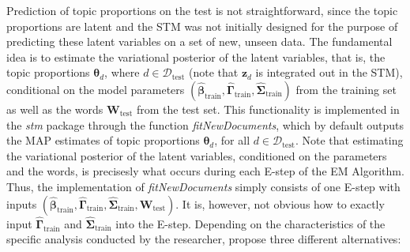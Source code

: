 Prediction of topic proportions on the test is not straightforward, since the topic proportions are latent and the STM was not initially designed for the purpose of predicting these latent variables on a set of new, unseen data. The fundamental idea is to estimate the variational posterior of the latent variables, that is, the topic proportions $\boldsymbol{\theta}_d$, where $d \in \mathcal{D}_{\text{test}}$ (note that $\boldsymbol{z}_d$ is integrated out in the STM), conditional on the model parameters $(\hat{\boldsymbol{\beta}}_{\text{train}}, \hat{\boldsymbol{\Gamma}}_{\text{train}}, \hat{\boldsymbol{\Sigma}}_{\text{train}})$ from the training set as well as the words $\boldsymbol{W}_{\text{test}}$ from the test set. This functionality is implemented in the \textit{stm} package through the function \textit{fitNewDocuments}, which by default outputs the MAP estimates of topic proportions $\boldsymbol{\theta}_d$, for all $d \in \mathcal{D}_{\text{test}}$. Note that estimating the variational posterior of the latent variables, conditioned on the parameters and the words, is precisesly what occurs during each E-step of the EM Algorithm. Thus, the implementation of \textit{fitNewDocuments} simply consists of one E-step with inputs $(\hat{\boldsymbol{\beta}}_{\text{train}}, \hat{\boldsymbol{\Gamma}}_{\text{train}}, \hat{\boldsymbol{\Sigma}}_{\text{train}}, \boldsymbol{W}_{\text{test}})$. It is, however, not obvious how to exactly input $\hat{\boldsymbol{\Gamma}}_{\text{train}}$ and  $\hat{\boldsymbol{\Sigma}}_{\text{train}}$ into the E-step. Depending on the characteristics of the specific analysis conducted by the researcher, \cite{egami2018make} propose three different alternatives:
